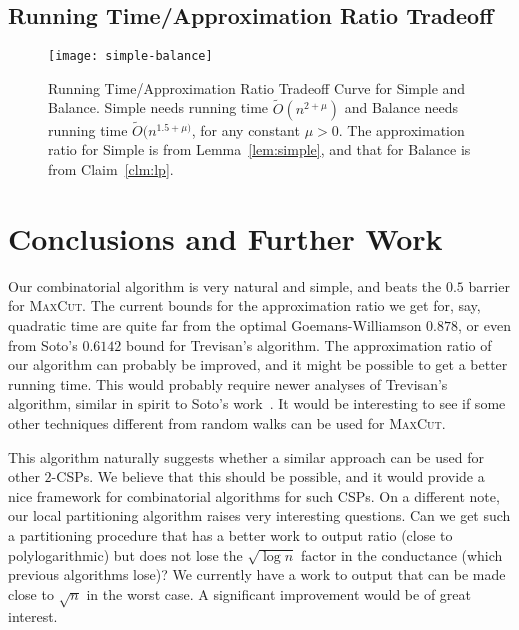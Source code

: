 \documentclass[11pt]{article}
\newcommand\Balance{{\sc Balance}\xspace}
\newcommand\Simple{{\sc Simple}\xspace}
\newcommand\otilde{\widetilde{O}}
\def\maxcut{\textsc{MaxCut}\xspace}
\begin{document}
\subsection{Running Time/Approximation Ratio Tradeoff}


\begin{figure}[htbp] \centering
    \texttt{[image: simple-balance]} \caption{Running Time/Approximation Ratio Tradeoff Curve for \Simple and \Balance. \Simple
    needs running time $\otilde(n^{2+\mu})$ and \Balance needs running time $\otilde(n^{1.5+\mu)}$, for any constant $\mu > 0$. The approximation ratio for \Simple is from Lemma~\ref{lem:simple}, and that for \Balance is from Claim~\ref{clm:lp}.}
    \label{fig:simple-balance}
\end{figure}


\section{Conclusions and Further Work}

Our combinatorial algorithm is very natural and simple, and beats
the $0.5$ barrier for \maxcut. The current bounds for the approximation
ratio we get for, say, quadratic time are quite far from the
optimal Goemans-Williamson $0.878$, or even from Soto's $0.6142$ bound
for Trevisan's algorithm.
The approximation ratio of our algorithm can probably be improved, and it might
be possible to get a better running time. This would probably
require newer analyses of Trevisan's algorithm, similar in spirit
to Soto's work~\cite{Sot09}.
It would be interesting to
see if some other techniques different from random walks
can be used for \maxcut.

This algorithm naturally suggests whether a similar approach can
be used for other $2$-CSPs. We believe that this should be possible,
and it would provide a nice framework for combinatorial algorithms
for such CSPs. On a different note, our local partitioning algorithm
raises very interesting questions. Can we get such a partitioning
procedure that has a better work to output ratio (close to polylogarithmic)
but does not lose the $\sqrt{\log n}$ factor in the conductance
(which previous algorithms lose)? We currently have a work to output
that can be made close to $\sqrt{n}$ in the worst case.
A significant improvement would be of great interest.



\end{document}

